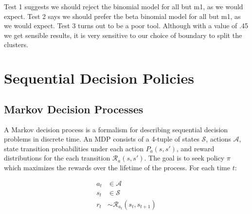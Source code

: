 \documentclass[11pt,a4,singlespacing,titlepagenumber=on]{scrreprt}
\numberwithin{equation}{chapter} %
\theoremstyle{remark}
\begin{document}
Test 1 suggests we should reject the binomial model for all but m1, as we would expect.
Test 2 says we should prefer the beta binomial model for all but m1, as we would expect. 
Test 3 turns out to be a poor tool. Although with a value of .45 we get sensible results, it is very sensitive to our choice of boundary to split the clusters.


%

\chapter{ Sequential Decision Policies }

\section{ Markov Decision Processes }

A Markov decision process is a formalism for describing sequential decision problems in discrete time. An MDP consists of a 4-tuple of states $\mathcal{S}$, actions $\mathcal{A}$, state transition probabilities under each action $P_a(s,s')$, and reward distributions for the each transition $\mathcal{R}_a(s,s')$. The goal is to seek policy $\pi$ which maximizes the rewards over the lifetime of the process. For each time $t$:

\begin{align}
a_t &\in \mathcal{A} \\
s_t &\in \mathcal{S} \\
r_t &\sim \mathcal{R}_{a_t}(s_t,s_{t+1})
\end{align}
\end{document}
